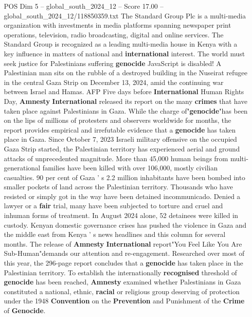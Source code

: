 \begin{textsample}{POS Dim 5 – global\_south\_2024\_12 – Score 17.00 – global\_south\_2024\_12/118850359.txt}  \label{ex:f5_pos_053}
The Standard Group Plc is a multi-media organization with investments in media platforms spanning newspaper print operations, television, radio broadcasting, digital and online services.
The Standard Group is recognized as a leading multi-media house in Kenya with a key influence in matters of national and \textbf{international} interest.
The world must seek justice for Palestinians suffering \textbf{genocide} JavaScript is disabled!
A Palestinian man sits on the rubble of a destroyed building in the Nuseirat refugee in the central Gaza Strip on December 13, 2024, amid the continuing war between Israel and Hamas.
AFP Five days before \textbf{International} Human Rights Day, \textbf{Amnesty} \textbf{International} released its report on the many \textbf{crimes} that have taken place against Palestinians in Gaza.
While the charge of"\textbf{genocide}"has been on the lips of millions of protesters and observers worldwide for months, the report provides empirical and irrefutable evidence that a \textbf{genocide} has taken place in Gaza.
Since October 7, 2023 Israeli military offensive on the occupied Gaza Strip started, the Palestinian territory has experienced aerial and ground attacks of unprecedented magnitude.
More than 45,000 human beings from multi-generational families have been killed with over 106,000, mostly civilian casualties. 90 per cent of Gaza ' s 2.2 million inhabitants have been bombed into smaller pockets of land across the Palestinian territory.
Thousands who have resisted or simply got in the way have been detained incommunicado.
Denied a lawyer or a \textbf{fair} trial, many have been subjected to torture and cruel and inhuman forms of treatment.
In August 2024 alone, 52 detainees were killed in custody.
Kenyan domestic governance crises has pushed the violence in Gaza and the middle east from Kenya ' s news headlines and this column for several months.
The release of \textbf{Amnesty} \textbf{International} report"You Feel Like You Are Sub-Human"demands our attention and re-engagement.
Researched over most of this year, the 296-page report concludes that a \textbf{genocide} has taken place in the Palestinian territory.
To establish the internationally \textbf{recognised} threshold of \textbf{genocide} has been reached, \textbf{Amnesty} examined whether Palestinians in Gaza constituted a national, ethnic, \textbf{racial} or religious group deserving of protection under the 1948 \textbf{Convention} on the \textbf{Prevention} and Punishment of the \textbf{Crime} of \textbf{Genocide}.

\end{textsample}
